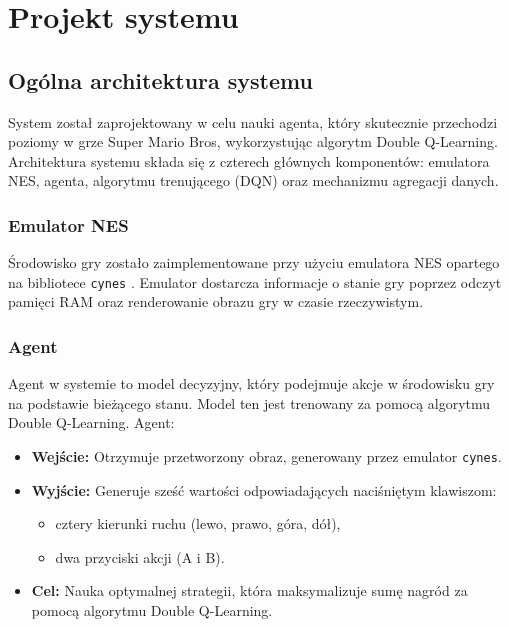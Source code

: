 \chapter{Projekt systemu}

\section{Ogólna architektura systemu}

System został zaprojektowany w celu nauki agenta, który skutecznie przechodzi poziomy w grze Super Mario Bros, wykorzystując algorytm Double Q-Learning. Architektura systemu składa się z czterech głównych komponentów: emulatora NES, agenta, algorytmu trenującego (DQN) oraz mechanizmu agregacji danych.

\subsection{Emulator NES}

Środowisko gry zostało zaimplementowane przy użyciu emulatora NES opartego na bibliotece \texttt{cynes} \cite{CYNES}. Emulator dostarcza informacje o stanie gry poprzez odczyt pamięci RAM oraz renderowanie obrazu gry w czasie rzeczywistym.

\subsection{Agent}

Agent w systemie to model decyzyjny, który podejmuje akcje w środowisku gry na podstawie bieżącego stanu. Model ten jest trenowany za pomocą algorytmu Double Q-Learning. Agent:

\begin{itemize}
	\item \textbf{Wejście:} Otrzymuje przetworzony obraz, generowany przez emulator \texttt{cynes}.
	\item \textbf{Wyjście:} Generuje sześć wartości odpowiadających naciśniętym klawiszom:
	      \begin{itemize}
		      \item cztery kierunki ruchu (lewo, prawo, góra, dół),
		      \item dwa przyciski akcji (A i B).
	      \end{itemize}
	\item \textbf{Cel:} Nauka optymalnej strategii, która maksymalizuje sumę nagród za pomocą algorytmu Double Q-Learning.
\end{itemize}
